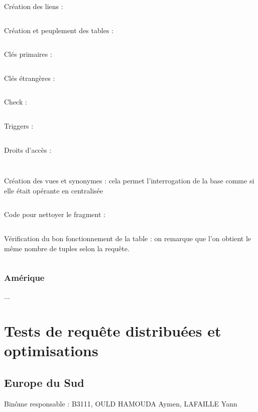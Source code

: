 \documentclass[10pt,a4paper]{article}
\theoremstyle{plain}
\begin{document}
Création des liens :
\inputminted{sql}{EUS_III-C-2-creation_liens.sql}
\newpage

Création et peuplement des tables :
\inputminted{sql}{EUS_III-C-3-creation_tables.sql}
\newpage

Clés primaires : 
\inputminted{sql}{EUS_III-C-5-Primary_key.sql}
\newpage

Clés étrangères :
\inputminted{sql}{EUS_III-C-5_foreign_key.sql}
\newpage

Check :
\inputminted{sql}{EUS_III-C-5_check.sql}
\newpage

Triggers : 
\inputminted{sql}{EUS_III-C-5_trigger.sql}
\newpage

Droits d'accès : 
\inputminted{sql}{EUS_III-C-6.sql}
\inputminted{sql}{EUS_III-C-6_2.sql}
\newpage

Création des vues et synonymes : cela permet l'interrogation de la base comme si elle était opérante en centralisée

\inputminted{sql}{EUS_III-C-7.sql}
\newpage

Code pour nettoyer le fragment :
\inputminted{sql}{EUS_III-C-8.sql}
\newpage

Vérification du bon fonctionnement de la table : on remarque que l'on obtient le même nombre de tuples selon la requête.
\inputminted{sql}{EUS_III-C-9.sql}
\newpage 

\subsubsection{Amérique}
...
\newpage

\section{Tests de requête distribuées et optimisations}
\subsection{Europe du Sud}
Binôme responsable : B3111, OULD HAMOUDA Aymen, LAFAILLE Yann
\end{document}
